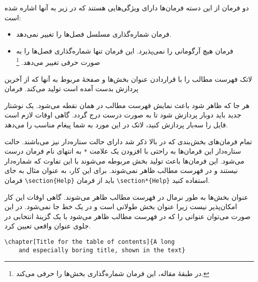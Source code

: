 دو فرمان از این دسته فرمان‌ها دارای ویژگی‌هایی هستند که در زیر به آنها اشاره شده است:

\begin{itemize}
\item 
فرمان 
شماره‌گذاری مسلسل فصل‌ها را تغییر نمی‌دهد.
\item 
فرمان 
هیچ آرگومانی را نمی‌پذیرد. این فرمان تنها شماره‌گذاری فصل‌ها را به صورت حرفی تغییر می‌دهد.%
\footnote{در طبقهٔ مقاله، این فرمان شماره‌گذاری بخش‌ها را حرفی می‌کند.}
\end{itemize}

لاتک فهرست مطالب را با قراردادن عنوان بخش‌ها و صفحهٔ مربوط به آنها که از آخرین پردازش بدست آمده است تولید می‌کند. فرمان
\begin{lscommand} 
\end{lscommand} 
\noindent
هر جا که ظاهر شود باعث نمایش فهرست مطالب در همان نقطه می‌شود. یک نوشتار جدید باید دوبار پردازش شود تا 
به صورت درست درج گردد. گاهی اوقات لازم است فایل را سه‌بار پردازش کنید، لاتک در این مورد به شما پیغام مناسب را می‌دهد.

تمام فرمان‌های بخش‌بندی که در بالا ذکر شد دارای حالت ستاره‌دار نیز می‌باشند. حالت ستاره‌دار این فرمان‌ها به راحتی با افزودن یک علامت 
\verb|*|
به انتهای نام فرمان درست می‌شود. این فرمان‌ها باعث تولید بخش مربوطه می‌شوند با این تفاوت که شماره‌دار نیستند و در فهرست مطالب ظاهر نمی‌شوند. 
برای این کار، به عنوان مثال به جای فرمان 
\verb|\section{Help}|
باید از فرمان  
\verb|\section*{Help}|
استفاده کنید.

عنوان بخش‌ها به طور نرمال در فهرست مطالب ظاهر می‌شوند. گاهی اوقات این کار امکان‌\-پذیر نیست زیرا عنوان بخش طولانی است و در یک خط جا نمی‌شود. در این صورت می‌توان عنوانی را که در فهرست مطالب ظاهر می‌شود با یک گزینهٔ انتخابی در جلوی عنوان واقعی تعیین کرد.
\begin{code}
\verb|\chapter[Title for the table of contents]{A long|\\
\verb|    and especially boring title, shown in the text}|
\end{code} 

